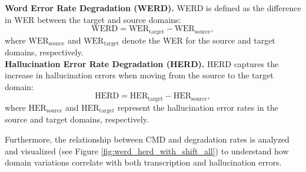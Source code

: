 \noindent\textbf{Word Error Rate Degradation (WERD).} WERD is defined as the difference in WER between the target and source domains:
\begin{equation}
\text{WERD} = \text{WER}_{\text{target}} - \text{WER}_{\text{source}},
\label{eq:2}
\end{equation}
where \(\text{WER}_{\text{source}}\) and \(\text{WER}_{\text{target}}\) denote the WER for the source and target domains, respectively.\\

\noindent\textbf{Hallucination Error Rate Degradation (HERD).} HERD captures the increase in hallucination errors when moving from the source to the target domain:
\begin{equation}
\text{HERD} = \text{HER}_{\text{target}} - \text{HER}_{\text{source}},
\label{eq:3}
\end{equation}
where \(\text{HER}_{\text{source}}\) and \(\text{HER}_{\text{target}}\) represent the hallucination error rates in the source and target domains, respectively.

Furthermore, the relationship between CMD and degradation rates is analyzed and visualized (see Figure \ref{fig:werd_herd_with_shift_all}) to understand how domain variations correlate with both transcription and hallucination errors.